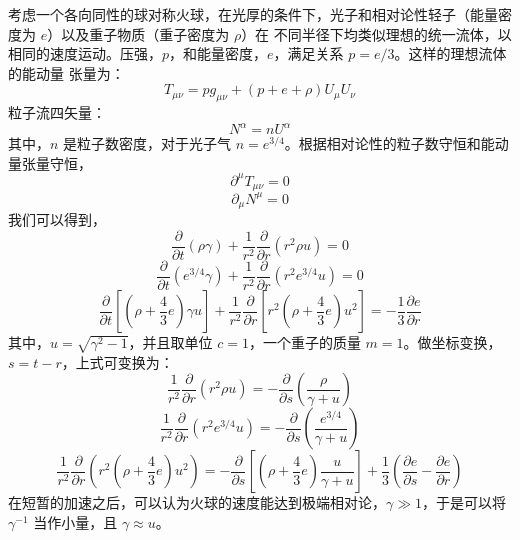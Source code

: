 	考虑一个各向同性的球对称火球，在光厚的条件下，光子和相对论性轻子（能量密度为 $e$）以及重子物质（重子密度为 $\rho$）在
	不同半径下均类似理想的统一流体，以相同的速度运动。压强，$p$，和能量密度，$e$，满足关系 $p=e/3$。这样的理想流体的能动量
	张量为：
	\begin{equation}
	T_{\mu\nu}=pg_{\mu\nu}+(p+e+\rho)U_{\mu}U_{\nu}
	\end{equation}
	粒子流四矢量：
	\begin{equation}
	N^{\alpha}=nU^{\alpha}
	\end{equation}
	其中，$n$ 是粒子数密度，对于光子气 $n=e^{3/4}$。根据相对论性的粒子数守恒和能动量张量守恒，
	\begin{equation}
	\partial^{\mu}T_{\mu\nu}=0
	\end{equation}
	\begin{equation}
	\partial_{\mu}N^{\mu}=0
	\end{equation}
	我们可以得到，
	\begin{equation}
	\frac{\partial}{\partial t}(\rho \gamma)+\frac{1}{r^{2}}\frac{\partial}{\partial r}(r^{2}\rho u)=0
	\end{equation}
	\begin{equation}
	\frac{\partial}{\partial t}(e^{3/4}\gamma)+\frac{1}{r^{2}}\frac{\partial}{\partial r}(r^{2}e^{3/4}u)=0
	\end{equation}
	\begin{equation}
	\frac{\partial}{\partial t}[(\rho+\frac{4}{3}e)\gamma u]+\frac{1}{r^{2}}\frac{\partial}{\partial r}[r^{2}(\rho+\frac{4}{3}e)u^{2}]=-\frac{1}{3}\frac{\partial e}{\partial r}
	\end{equation}
	其中，$u=\sqrt{\gamma^{2}-1}$，并且取单位 $c=1$，一个重子的质量 $m=1$。做坐标变换，
	$s=t-r$，上式可变换为：
	\begin{equation}
	\frac{1}{r^{2}}\frac{\partial}{\partial r}(r^{2}\rho u)=-\frac{\partial}{\partial s}(\frac{\rho}{\gamma+u})
	\end{equation}
	\begin{equation}
	\frac{1}{r^{2}}\frac{\partial}{\partial r}(r^{2}e^{3/4}u)=-\frac{\partial}{\partial s}(\frac{e^{3/4}}{\gamma+u})
	\end{equation}
	\begin{equation}
	\frac{1}{r^{2}}\frac{\partial}{\partial r}(r^{2}(\rho+\frac{4}{3}e)u^{2})=-\frac{\partial}{\partial s}[(\rho+\frac{4}{3}e)\frac{u}{\gamma+u}]+\frac{1}{3}(\frac{\partial e}{\partial s}-\frac{\partial e}{\partial r})
	\end{equation}
	在短暂的加速之后，可以认为火球的速度能达到极端相对论，$\gamma\gg1$，于是可以将 $\gamma^{-1}$ 当作小量，且 $\gamma\approx u$。
